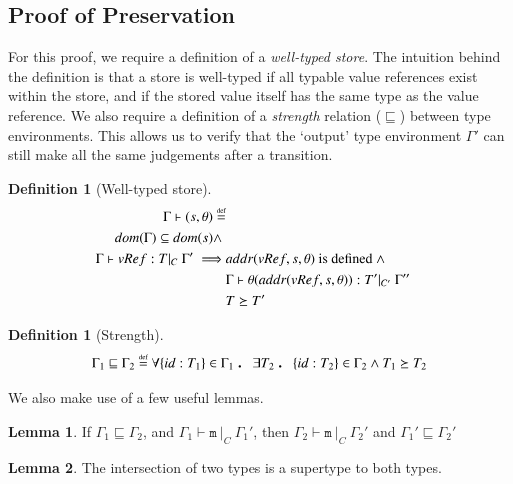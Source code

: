 \documentclass[12pt,a4paper,twoside,openright]{report}
\theoremstyle{definition}
\newtheorem{definition}[equation]{Definition}
\theoremstyle{dotless}
\newtheorem{lemma}[definition]{Lemma}
\newcommand\eqdef{\mathrel{\overset{\makebox[0pt]{\mbox{\normalfont\tiny def}}}{=}}}
\newcommand\qdot{\mathbin{\scalebox{1.5}{.}}\enspace}
\begin{document}
\subsection{Proof of Preservation}

For this proof, we require a definition of a \textit{well-typed store}.  The
intuition behind the definition is that a store is well-typed if all typable
value references exist within the store, and if the stored value
itself has the same type as the value reference. We also require a definition
of a \textit{strength} relation ($\sqsubseteq$) between type environments. This
allows us to verify that the `output' type environment $\Gamma'$ 
can still make all the same judgements after a transition.

\begin{definition}[Well-typed store]
  \begin{equation} \label{eqn:typed-store}
  	\begin{split}
  	  \Gamma\vdash(s,\theta)\eqdef \\
  	  dom(\Gamma) \subseteq dom(s) \land\ & \\
  	  \Gamma \vdash vRef:T|_C\ \Gamma' \implies & addr(vRef,s, \theta)\textrm{ is defined}\ \land \\
  	  & \Gamma\vdash\theta(addr(vRef,s,\theta)):T'|_{C'}\ \Gamma'' \\
	  & T\succeq T'
  	\end{split}
  \end{equation}
\end{definition}
\begin{definition}[Strength]
  \begin{equation} \label{eqn:strength}
	\Gamma_1 \sqsubseteq \Gamma_2 \eqdef 
	\forall\{id:T_1\}\in\Gamma_1 \qdot \exists T_2 \qdot \{id:T_2\}\in\Gamma_2 \land T_1\succeq T_2
  \end{equation}
\end{definition}

We also make use of a few useful lemmas.
\begin{lemma}
  \label{lm:strChain}
  If $\Gamma_1 \sqsubseteq \Gamma_2$, and $\Gamma_1\vdash\mathtt{m}\ |_C\ \Gamma_1'$, 
  then $\Gamma_2\vdash\mathtt{m}\ |_C\ \Gamma_2'$ and
  $\Gamma_1'\sqsubseteq\Gamma_2'$ 
\end{lemma}
\begin{lemma}
  \label{lm:intersect}
  The intersection of two types is a supertype to both types. 
\end{lemma}
\end{document}
